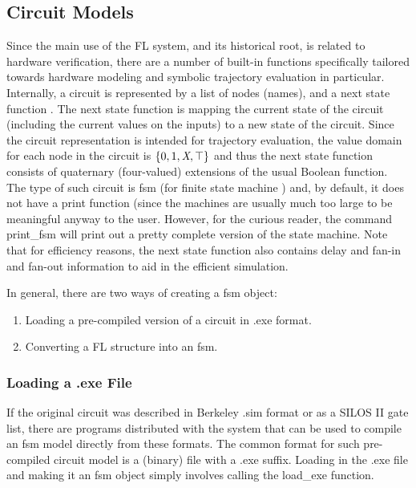\subsection{Circuit Models}

Since the main use of the FL system, and its historical root, is related
to hardware verification, there are a number of built-in
functions specifically tailored towards hardware modeling
and symbolic trajectory evaluation in particular. 
Internally, a circuit is represented by a list of nodes (names),
and a next state function%
%
{}.
The next state function is mapping the current state of the circuit
(including the current values on the inputs) to a new state
of the circuit.
Since the circuit representation is intended for trajectory evaluation,
the value domain for each node in the circuit is $\{0,1,\mbox{\em X},\top\}$
and thus the next state function consists of quaternary%
%
{} (four-valued)
extensions of the usual Boolean function.
The type of such circuit is fsm%
%
{} (for finite state machine%
%
{}) and, by
default, it does not have a print function (since the machines
are usually much too large to be meaningful anyway to the user.
However, for the curious reader, the command print\_fsm%
%
{} will print out
a pretty complete version of the state machine.
Note that for efficiency reasons, the next state function also
contains delay and fan-in and fan-out information to aid in the
efficient simulation.

In general, there are two ways of creating a fsm object:
\begin{enumerate}
\item
Loading a pre-compiled version of a circuit in .exe format.
\item
Converting a FL structure into an fsm.
\end{enumerate}

\subsubsection{Loading a .exe File}

If the original circuit was described in Berkeley .sim format or
as a SILOS II gate list, there are programs distributed with the
system that can be used to compile an fsm model directly from
these formats.
The common format for such pre-compiled circuit model is a (binary)
file with a .exe%
%
{} suffix.
Loading in the .exe file and making it an fsm object simply
involves calling the load\_exe function.

